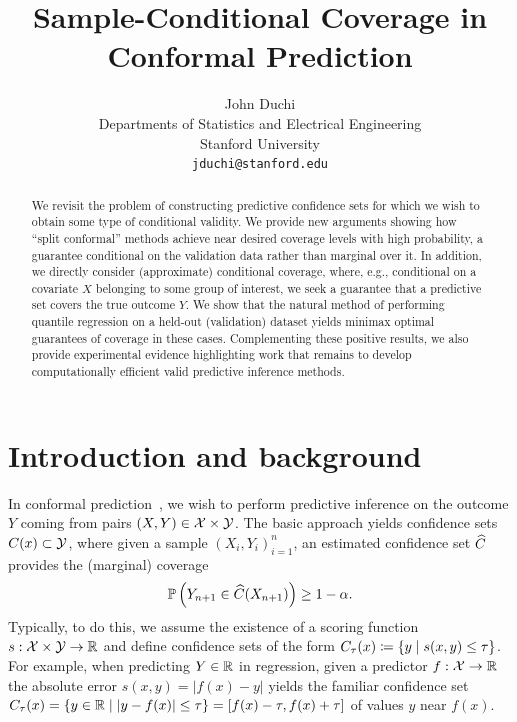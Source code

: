 \documentclass{article}
\title{Sample-Conditional Coverage in Conformal Prediction}
\author{John Duchi \\
  Departments of Statistics and Electrical Engineering \\
  Stanford University \\
  \texttt{jduchi@stanford.edu}
}
\newcommand{\scorefunc}{s}
\begin{document}
\maketitle

\begin{abstract}
  We revisit the problem of constructing predictive confidence sets
  for which we wish to obtain some type of conditional
  validity.
  We provide new arguments showing how ``split conformal'' methods
  achieve near desired coverage levels with high probability, a
  guarantee conditional on the validation data rather than
  marginal over it.
  In addition, we directly consider (approximate) conditional coverage,
  where, e.g., conditional on a covariate $X$ belonging to some
  group of interest, we seek a guarantee that a predictive set
  covers the true outcome $Y$.
  We show that the natural method of performing quantile regression on a
  held-out (validation) dataset yields minimax optimal guarantees of
  coverage in these cases.
  Complementing these positive results, we also provide experimental
  evidence highlighting work that remains to develop
  computationally efficient valid predictive inference methods.
\end{abstract}

\section{Introduction and background}

In conformal
prediction~\cite{VovkGaSh05,LeiWa14,LeiGSRiTiWa18,BarberCaRaTi21a}, we wish
to perform predictive inference on the outcome $Y$ coming from pairs $(X, Y)
\in \mathcal{X} \times \mathcal{Y}$.
%
The basic approach yields confidence sets $C(x) \subset \mathcal{Y}$, where given
a sample $(X_i, Y_i)_{i = 1}^n$, an estimated confidence set
$\widehat{C}$ provides the (marginal) coverage
\begin{equation}
  \label{eqn:marginal-guarantee}
  \mathbb{P}\left(Y_{n + 1} \in \widehat{C}(X_{n + 1})\right) \ge 1 - \alpha.
\end{equation}
%
Typically, to do this, we assume the existence of a scoring function
$\scorefunc : \mc{X} \times \mc{Y} \to \R$ and define confidence sets
of the form $C_\tau(x) \defeq \{y \mid \scorefunc(x, y) \le \tau\}$.
%
For example, when predicting $Y \in \mathbb{R}$ in regression, given a
predictor $f : \mathcal{X} \to \mathbb{R}$ the absolute error $\scorefunc(x, y) =
|f(x) - y|$ yields the familiar confidence set $C_\tau(x) = \{y \in \mathbb{R} \mid
|y - f(x)| \le \tau\} = [f(x) - \tau, f(x) + \tau]$ of values $y$ near
$f(x)$.
\end{document}
